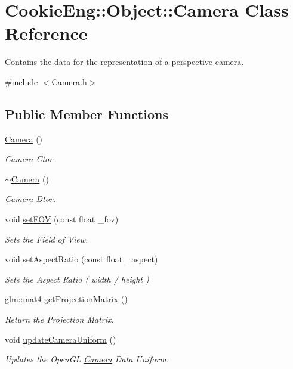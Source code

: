 \hypertarget{class_cookie_eng_1_1_object_1_1_camera}{}\section{Cookie\+Eng\+:\+:Object\+:\+:Camera Class Reference}
\label{class_cookie_eng_1_1_object_1_1_camera}


Contains the data for the representation of a perspective camera.  




{\ttfamily \#include $<$Camera.\+h$>$}

\subsection*{Public Member Functions}
\begin{DoxyCompactItemize}
\item 
\hyperlink{class_cookie_eng_1_1_object_1_1_camera_aa98f73385bfef2dd29f3763dd6a7549c}{Camera} ()
\begin{DoxyCompactList}\small\item\em \hyperlink{class_cookie_eng_1_1_object_1_1_camera}{Camera} Ctor. \end{DoxyCompactList}\item 
\hyperlink{class_cookie_eng_1_1_object_1_1_camera_a8d672ca800d63af6fe3d6665471a2b05}{$\sim$\+Camera} ()
\begin{DoxyCompactList}\small\item\em \hyperlink{class_cookie_eng_1_1_object_1_1_camera}{Camera} Dtor. \end{DoxyCompactList}\item 
void \hyperlink{class_cookie_eng_1_1_object_1_1_camera_aef44a3e6cef1540be7e8bcb977dddd78}{set\+F\+OV} (const float \+\_\+fov)
\begin{DoxyCompactList}\small\item\em Sets the Field of View. \end{DoxyCompactList}\item 
void \hyperlink{class_cookie_eng_1_1_object_1_1_camera_a2a86235e64f591e8c812f1d69be30a94}{set\+Aspect\+Ratio} (const float \+\_\+aspect)
\begin{DoxyCompactList}\small\item\em Sets the Aspect Ratio ( width / height ) \end{DoxyCompactList}\item 
glm\+::mat4 \hyperlink{class_cookie_eng_1_1_object_1_1_camera_afa69ef269138610423e2dc8707720500}{get\+Projection\+Matrix} ()
\begin{DoxyCompactList}\small\item\em Return the Projection Matrix. \end{DoxyCompactList}\item 
void \hyperlink{class_cookie_eng_1_1_object_1_1_camera_a0b8a35f92490adf193d36f2906a2c1d8}{update\+Camera\+Uniform} ()
\begin{DoxyCompactList}\small\item\em Updates the Open\+GL \hyperlink{class_cookie_eng_1_1_object_1_1_camera}{Camera} Data Uniform. \end{DoxyCompactList}\end{DoxyCompactItemize}
